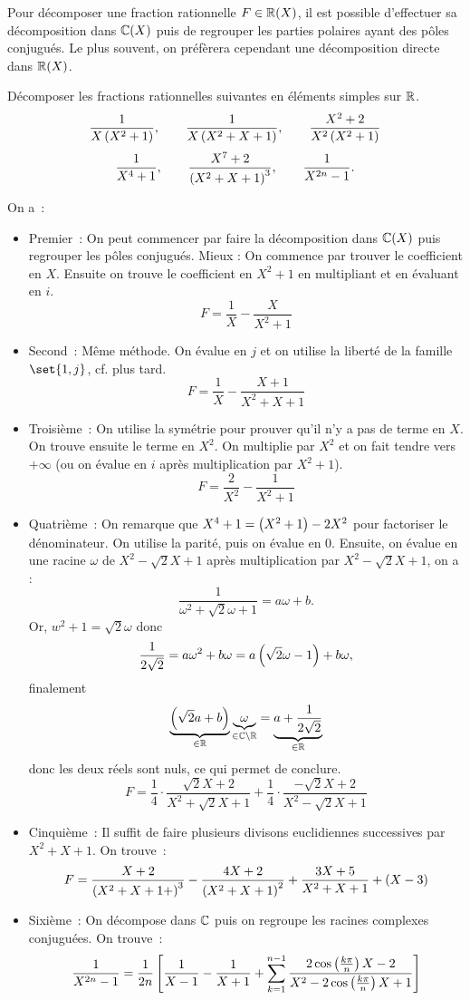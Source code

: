 \documentclass{magnolia}
\begin{document}
\begin{remarqueUnique}
\remarque Pour décomposer une fraction rationnelle $F\in\fracR$, il est possible
  d'effectuer sa décomposition dans $\fracC$ puis de regrouper les parties polaires
  ayant des pôles conjugués. Le plus souvent, on préfèrera cependant une décomposition
  directe dans $\fracR$.
\end{remarqueUnique}

\begin{exoUnique}
\exo Décomposer les fractions rationnelles suivantes en éléments simples sur
  $\mathbb{R}$.
  \[\frac{1}{X\left(X^2+1\right)}, \qquad \frac{1}{X\left(X^2+X+1\right)}, \qquad
    \frac{X^2+2}{X^2\left(X^2+1\right)}\]
  \[\frac{1}{X^4+1}, \qquad \frac{X^7+2}{\left(X^2+X+1\right)^3}, \qquad
    \frac{1}{X^{2n}-1}.\]
  \begin{sol}
  On a~:
  \begin{itemize}
  \item Premier~: On peut commencer par faire la décomposition dans $\fracC$
    puis regrouper les pôles conjugués.
    Mieux : On commence par trouver le coefficient en $X$. Ensuite on
    trouve le coefficient en $X^2+1$ en multipliant et en évaluant en $i$.
    \[F=\frac{1}{X}-\frac{X}{X^2+1}\]
  \item Second~: Même méthode. On évalue en $j$ et on utilise la liberté de la famille $\set{1,j}$, cf. plus tard.
    \[F=\frac{1}{X}-\frac{X+1}{X^2+X+1}\]
  \item Troisième~: On utilise la symétrie pour prouver qu'il n'y a pas de terme
    en $X$. On trouve ensuite le terme en $X^2$. On multiplie par $X^2$ et on fait
    tendre vers $+\infty$ (ou on évalue en $i$ après multiplication par $X^2+1$).
    \[F=\frac{2}{X^2}-\frac{1}{X^2+1}\]
  \item Quatrième~: On remarque que $X^4+1=\left(X^2+1\right)-2X^2$ pour factoriser le
    dénominateur. On utilise la parité, puis on évalue en $0$. Ensuite, on évalue
    en une racine $\omega$ de $X^2-\sqrt{2}X+1$ après multiplication par $X^2-\sqrt{2}X+1$, on a :
    $$\frac{1}{\omega^2+\sqrt{2}\omega+1}=a\omega+b.$$ Or, $w^2+1=\sqrt{2}\omega$ donc $$\frac{1}{2\sqrt{2}}=a\omega^2+b\omega=a\left(\sqrt{2}\omega-1\right)+b\omega,$$ finalement $$\underbrace{\left(\sqrt{2}a+b\right)}_{\in \mathbb{R}}\underbrace{\omega}_{\in \mathbb{C}\setminus\mathbb{R}}=\underbrace{a+\frac{1}{2\sqrt{2}}}_{\in \mathbb{R}}$$ donc les deux réels sont nuls, ce qui permet de conclure. 
    \[F=\frac{1}{4}\cdot\frac{\sqrt{2}X+2}{X^2+\sqrt{2}X+1}+\frac{1}{4}\cdot
      \frac{-\sqrt{2}X+2}{X^2-\sqrt{2}X+1}\]
  \item Cinquième~: Il suffit de faire plusieurs divisons euclidiennes
    successives par $X^2+X+1$. On trouve~:
    \[F=\frac{X+2}{\left(X^2+X+1+\right)^3}-\frac{4X+2}{\left(X^2+X+1\right)^2}+
        \frac{3X+5}{X^2+X+1}+\left(X-3\right)\]
  \item Sixième~: On décompose dans $\mathbb{C}$ puis on regroupe les racines complexes
    conjuguées. On trouve~:
    \[\frac{1}{X^{2n}-1}=\frac{1}{2n}\left[\frac{1}{X-1}-\frac{1}{X+1}+\sum_{k=1}^{n-1}
      \frac{2\cos\left(\frac{k\pi}{n}\right)X-2}{X^2-2\cos\left(\frac{k\pi}{n}\right)X+1}\right]\]
  \end{itemize}
  \end{sol}
\end{exoUnique}
\end{document}
